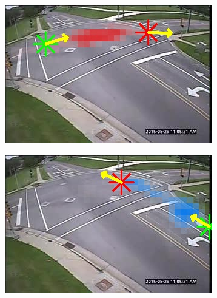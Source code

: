 \begin{figure}
    \centering
        \begin{subfigure}{0.32\linewidth}
            \includegraphics[width=\linewidth]{./img/scene_learning/res/244458/244458-0.jpg}
        \end{subfigure}
        \begin{subfigure}{0.32\linewidth}
            \includegraphics[width=\linewidth]{./img/scene_learning/res/244458/244458-1.jpg}
        \end{subfigure}


\end{figure}
